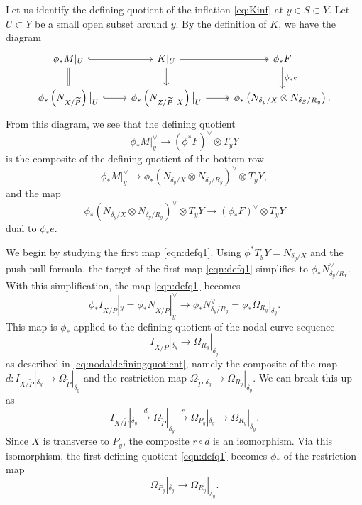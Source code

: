 \documentclass[11 pt]{amsart}
\providecommand {\from}{{\colon}}
\numberwithin{equation}{section}
\begin{document}
Let us identify the defining quotient of the inflation \eqref{eq:Kinf} at $y \in S \subset Y$.
Let $U \subset Y$ be a small open subset around $y$.
By the definition of $K$, we have the diagram
\begin{equation}\label{eq:preKU}
  \begin{tikzcd}
    \phi_*M|_U \arrow[hookrightarrow]{r}\arrow[equal]{d}& K|_U \arrow[two heads]{r} \arrow{d} &{\phi}_*F \arrow{d}{\phi_* e}\\
    {\phi}_*\left(N_{X/\widetilde{P}}\right)\big|_U \arrow[hookrightarrow]{r}& \phi_*\left( N_{Z/\widetilde{P}}\big|_X\right)\big|_U \arrow[two heads]{r}& \phi_*\left(N_{\delta_y/X} \otimes N_{\delta_S/R_y}\right).
  \end{tikzcd}
\end{equation}
From this diagram, we see that the defining quotient
\[ \phi_* M|_y^\vee \to (\phi^*F)^\vee \otimes T_yY\]
is the composite of the defining quotient of the bottom row
\begin{equation}\label{eqn:defq1}
  \phi_* M|_y^\vee \to \phi_*\left(N_{\delta_y/X} \otimes N_{\delta_y/R_y}\right)^\vee \otimes T_yY,
\end{equation}
and the map 
\begin{equation}\label{eqn:defq2}
  \phi_*\left(N_{\delta_y/X} \otimes N_{\delta_y/R_y}\right)^\vee \otimes T_yY \to (\phi_*F)^\vee \otimes T_yY
\end{equation}
dual to $\phi_*e$.

We begin by studying the first map \eqref{eqn:defq1}.
Using $\phi^*T_yY = N_{\delta_y/X}$ and the push-pull formula, the target of the first map \eqref{eqn:defq1} simplifies to $\phi_* N_{\delta_y/R_Y}^\vee$.
With this simplification, the map \eqref{eqn:defq1} becomes
\[ \phi_* I_{X/\widetilde P}|_y =  \phi_* N_{X/\widetilde P} |^\vee_y \to \phi_* N_{\delta_y/R_y}^\vee = \phi_*\Omega_{R_y}\big |_{\delta_y}.\]
This map is $\phi_*$ applied to the defining quotient of the nodal curve sequence
\[ I_{X/\widetilde P}|_{\delta_y} \to \Omega_{R_y}|_{\delta_y}\]
as described in \eqref{eq:nodaldefiningquotient}, namely the composite of the map $d \from I_{X/\widetilde P}|_{\delta_y} \to \Omega_{\widetilde P}|_{\delta_y}$ and the restriction map $\Omega_{\widetilde P}|_{\delta_y} \to \Omega_{R_y}|_{\delta_y}$.
We can break this up as
\[
  I_{X/\widetilde P}|_{\delta_y} \xrightarrow{d} \Omega_{\widetilde P} |_{\delta_y} \xrightarrow{r} \Omega_{P_y}|_{\delta_y} \to \Omega_{R_y}|_{\delta_y}.
\]
Since $X$ is transverse to $P_y$, the composite $r \circ d$ is an isomorphism.
Via this isomorphism, the first defining quotient \eqref{eqn:defq1} becomes $\phi_*$ of the restriction map
\[ \Omega_{P_y}|_{\delta_y} \to \Omega_{R_y}|_{\delta_y}.\]
\end{document}
